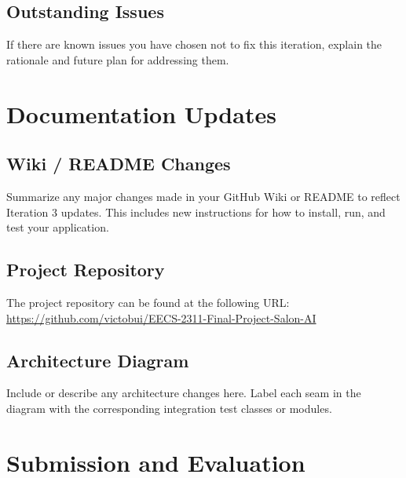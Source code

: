 \documentclass[12pt]{article}
\begin{document}
\subsection{Outstanding Issues}
If there are known issues you have chosen not to fix this iteration,
explain the rationale and future plan for addressing them.

\section{Documentation Updates}

\subsection{Wiki / README Changes}
Summarize any major changes made in your GitHub Wiki or README to reflect
Iteration 3 updates. This includes new instructions for how to install, run,
and test your application.

\subsection{Project Repository}
The project repository can be found at the following URL:
\url{https://github.com/victobui/EECS-2311-Final-Project-Salon-AI}

\subsection{Architecture Diagram}
Include or describe any architecture changes here. Label each seam in
the diagram with the corresponding integration test classes or modules.

\section{Submission and Evaluation}
\end{document}
